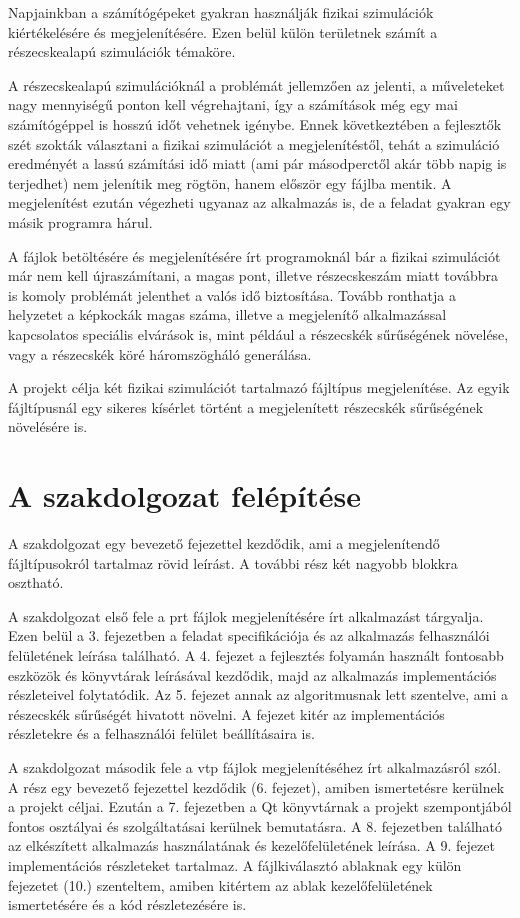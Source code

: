 Napjainkban a számítógépeket gyakran használják
fizikai szimulációk kiértékelésére
és megjelenítésére.
Ezen belül külön területnek számít
a részecskealapú szimulációk témaköre.

A részecskealapú 
szimulációknál a problémát jellemzően az jelenti,
a műveleteket nagy mennyiségű ponton kell végrehajtani,
így a számítások még egy 
mai számítógéppel is hosszú időt vehetnek igénybe.
Ennek következtében a fejlesztők szét szokták választani
a fizikai szimulációt a megjelenítéstől,
tehát a szimuláció eredményét 
a lassú számítási idő miatt
(ami pár másodperctől akár több napig is terjedhet)
nem jelenítik meg rögtön, 
hanem először egy fájlba mentik.
A megjelenítést ezután végezheti 
ugyanaz az alkalmazás is,
de a feladat gyakran egy másik programra hárul.

A fájlok betöltésére és megjelenítésére írt programoknál
bár a fizikai szimulációt már nem kell újraszámítani,
a magas pont, illetve részecskeszám miatt 
továbbra is komoly problémát
jelenthet a valós idő biztosítása.
Tovább ronthatja a helyzetet a képkockák magas száma,
illetve a megjelenítő alkalmazással kapcsolatos
speciális elvárások is, 
mint például a részecskék sűrűségének növelése,
vagy a részecskék köré háromszögháló generálása.

A projekt célja két fizikai szimulációt 
tartalmazó fájltípus megjelenítése.
Az egyik fájltípusnál egy sikeres kísérlet történt 
a megjelenített részecskék sűrűségének növelésére is.

\section{A szakdolgozat felépítése}

A szakdolgozat egy bevezető fejezettel kezdődik,
ami a megjelenítendő fájltípusokról tartalmaz
rövid leírást.
A további rész két nagyobb blokkra osztható.

A szakdolgozat első fele a prt fájlok megjelenítésére
írt alkalmazást tárgyalja.
Ezen belül a 3. fejezetben a feladat specifikációja
és az alkalmazás felhasználói felületének leírása
található.
A 4. fejezet a fejlesztés folyamán 
használt fontosabb eszközök 
és könyvtárak leírásával kezdődik, 
majd az alkalmazás implementációs részleteivel folytatódik.
Az 5. fejezet annak az algoritmusnak lett szentelve,
ami a részecskék sűrűségét hivatott növelni.
A fejezet kitér az implementációs részletekre
és a felhasználói felület beállításaira is.

A szakdolgozat második fele 
a vtp fájlok megjelenítéséhez írt alkalmazásról szól.
A rész egy bevezető fejezettel kezdődik (6. fejezet),
amiben ismertetésre kerülnek a projekt céljai. 
Ezután a 7. fejezetben 
a Qt könyvtárnak a projekt szempontjából fontos osztályai
és szolgáltatásai kerülnek bemutatásra.
A 8. fejezetben található az elkészített alkalmazás
használatának és kezelőfelületének leírása.
A 9. fejezet implementációs részleteket tartalmaz.
A fájlkiválasztó ablaknak egy külön fejezetet (10.) szenteltem,
amiben kitértem az ablak kezelőfelületének ismertetésére
és a kód részletezésére is.

